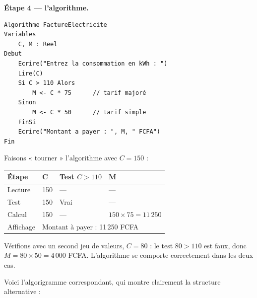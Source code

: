 \documentclass[11pt]{article}
\begin{document}
\textbf{Étape 4 — l'algorithme.}

\begin{lstlisting}
Algorithme FactureElectricite
Variables
    C, M : Reel
Debut
    Ecrire("Entrez la consommation en kWh : ")
    Lire(C)
    Si C > 110 Alors
        M <- C * 75      // tarif majoré
    Sinon
        M <- C * 50      // tarif simple
    FinSi
    Ecrire("Montant a payer : ", M, " FCFA")
Fin
\end{lstlisting}

\begin{exemplebox}
Faisons « tourner » l'algorithme avec $C = 150$ :

\begin{center}
\begin{tabularx}{\linewidth}{|l|X|X|X|}
\hline
\rowcolor{popblueL} \textbf{Étape} & \textbf{C} & \textbf{Test $C>110$} & \textbf{M} \\
\hline
Lecture & 150 & --- & --- \\
\hline
Test & 150 & Vrai & --- \\
\hline
Calcul & 150 & --- & $150 \times 75 = 11\,250$ \\
\hline
Affichage & \multicolumn{3}{X|}{Montant à payer : 11\,250 FCFA} \\
\hline
\end{tabularx}
\end{center}

Vérifions avec un second jeu de valeurs, $C = 80$ : le test $80 > 110$ est faux, donc $M = 80 \times 50 = 4\,000$ FCFA. L'algorithme se comporte correctement dans les deux cas.
\end{exemplebox}

Voici l'algorigramme correspondant, qui montre clairement la structure alternative :
\end{document}
